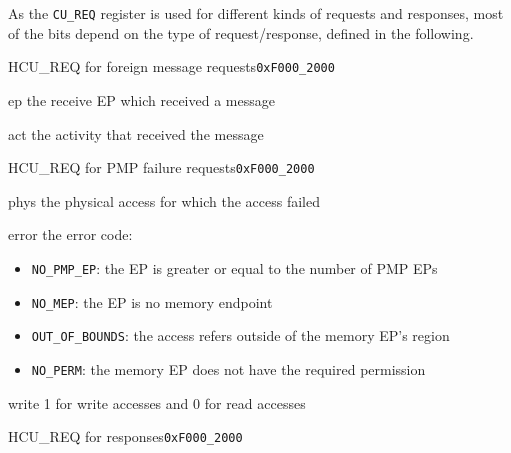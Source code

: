 \noindent As the \texttt{CU\_REQ} register is used for different kinds of requests and responses,
most of the bits depend on the type of request/response, defined in the following.

\begin{register}{H}{CU\_REQ for foreign message requests}{\texttt{0xF000\_2000}}
  \regnewline%
  \begin{regdesc}\begin{reglist}
    \item[ep] the receive EP which received a message
    \item[act] the activity that received the message
  \end{reglist}\end{regdesc}
\end{register}

\begin{register}{H}{CU\_REQ for PMP failure requests}{\texttt{0xF000\_2000}}
  \regnewline%
  \begin{regdesc}\begin{reglist}
    \item[phys] the physical access for which the access failed
    \item[error] the error code:
    \begin{itemize}
       \item \texttt{NO\_PMP\_EP}: the EP is greater or equal to the number of PMP EPs
       \item \texttt{NO\_MEP}: the EP is no memory endpoint
       \item \texttt{OUT\_OF\_BOUNDS}: the access refers outside of the memory EP's region
       \item \texttt{NO\_PERM}: the memory EP does not have the required permission
     \end{itemize}
    \item[write] 1 for write accesses and 0 for read accesses
  \end{reglist}\end{regdesc}
\end{register}

\begin{register}{H}{CU\_REQ for responses}{\texttt{0xF000\_2000}}
  \regnewline%
\end{register}
\extend{}

